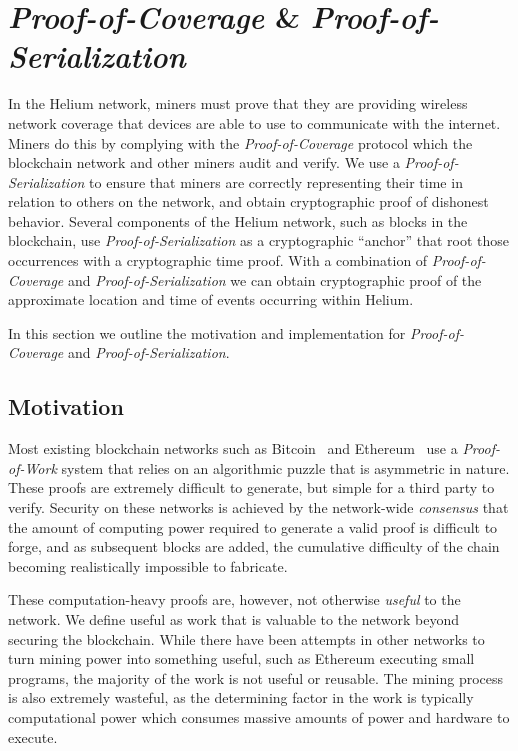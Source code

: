 \documentclass[letterpaper,11pt]{article}
\begin{document}
\newpage

\section{\emph{Proof-of-Coverage} \& \emph{Proof-of-Serialization}}\label{poc}

In the Helium network, miners must prove that they are providing wireless network coverage that devices are able to use to communicate with the internet. Miners do this by complying with the \emph{Proof-of-Coverage} protocol which the blockchain network and other miners audit and verify. We use a \emph{Proof-of-Serialization} to ensure that miners are correctly representing their time in relation to others on the network, and obtain cryptographic proof of dishonest behavior. Several components of the Helium network, such as blocks in the blockchain, use \emph{Proof-of-Serialization} as a cryptographic ``anchor'' that root those occurrences  with a cryptographic time proof. With a combination of \emph{Proof-of-Coverage} and \emph{Proof-of-Serialization} we can obtain cryptographic proof of the approximate location and time of events occurring within Helium.

In this section we outline the motivation and implementation for \emph{Proof-of-Coverage} and \emph{Proof-of-Serialization}.

\subsection{Motivation}

Most existing blockchain networks such as Bitcoin~\cite{bitcoin} and Ethereum~\cite{ethereum} use a \emph{Proof-of-Work} system that relies on an algorithmic puzzle that is asymmetric in nature. These proofs are extremely difficult to generate, but simple for a third party to verify. Security on these networks is achieved by the network-wide \emph{consensus} that the amount of computing power required to generate a valid proof is difficult to forge, and as subsequent blocks are added, the cumulative difficulty of the chain becoming realistically impossible to fabricate.

These computation-heavy proofs are, however, not otherwise \emph{useful} to the network. We define useful as work that is valuable to the network beyond securing the blockchain. While there have been attempts in other networks to turn mining power into something useful, such as Ethereum executing small programs, the majority of the work is not useful or reusable. The mining process is also extremely wasteful, as the determining factor in the work is typically computational power which consumes massive amounts of power and hardware to execute.
\end{document}
